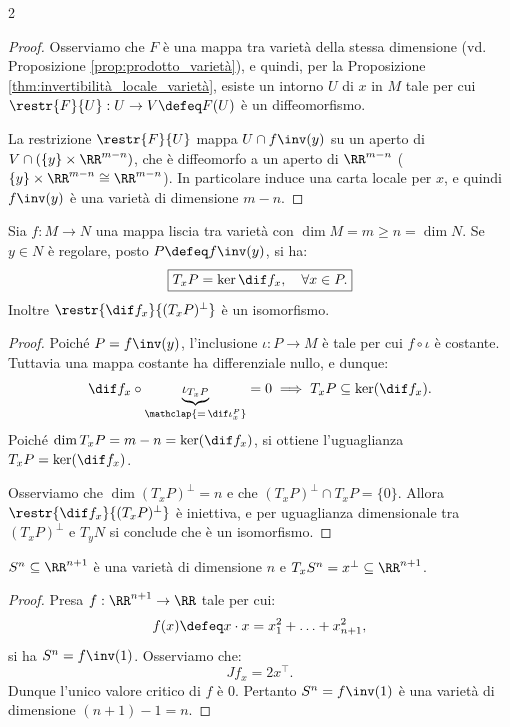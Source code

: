 \begin{multicols*}{2}
\begin{proof}
        Osserviamo che $F$ è una mappa tra varietà della stessa dimensione (vd. Proposizione
        \ref{prop:prodotto_varietà}), e quindi, per la Proposizione
        \ref{thm:invertibilità_locale_varietà}, esiste un intorno $U$ di $x$ in $M$ tale per cui
        $\restr{F}{U} : U \to V \defeq F(U)$ è un diffeomorfismo. \smallskip

        La restrizione $\restr{F}{U}$ mappa $U \cap f\inv(y)$ su un aperto di $V \cap (\{y\} \times \RR^{m-n})$,
        che è diffeomorfo a un aperto di $\RR^{m-n}$ ($\{y\} \times \RR^{m-n} \cong \RR^{m-n}$). In particolare
        induce una carta locale per $x$, e quindi $f\inv(y)$ è una varietà di dimensione $m-n$.
    \end{proof}

    \begin{proposition} \label{prop:tangente_valore_regolare}
        Sia $f : M \to N$ una mappa liscia tra varietà con $\dim M = m \geq n = \dim N$. Se
        $y \in N$ è regolare, posto $P \defeq f\inv(y)$, si ha:
        \[
            \boxed{T_x P = \ker \dif f_x, \quad \forall x \in P.}
        \]
        Inoltre $\restr{\dif f_x}{(T_x P)^\perp}$ è un isomorfismo.
    \end{proposition}

    \begin{proof}
        Poiché $P = f\inv(y)$, l'inclusione $\iota : P \to M$ è tale
        per cui $f \circ \iota$ è costante. Tuttavia una mappa costante
        ha differenziale nullo, e dunque:
        \[
            \dif f_x \circ \underbrace{\iota_{T_x P}}_{\mathclap{= \, \dif \iota^P_x}} = 0 \implies T_x P \subseteq \ker(\dif f_x).
        \]
        Poiché $\dim T_x P = m - n = \ker(\dif f_x)$, si ottiene
        l'uguaglianza $T_x P = \ker(\dif f_x)$. \smallskip

        Osserviamo che $\dim (T_x P)^\perp = n$ e che $(T_x P)^\perp \cap T_x P = \{0\}$.
        Allora $\restr{\dif f_x}{(T_x P)^\perp}$ è iniettiva, e per uguaglianza dimensionale
        tra $(T_x P)^\perp$ e $T_y N$ si conclude che è un isomorfismo.
    \end{proof}

    \begin{corollary} \label{cor:sn_è_varietà}
        $S^n \subseteq \RR^{n+1}$ è una varietà di dimensione $n$ e $T_x S^n = x^\perp \subseteq \RR^{n+1}$.
    \end{corollary}

    \begin{proof}
        Presa $f : \RR^{n+1} \to \RR$ tale per cui:
        \[
            f(x) \defeq x \cdot x = x_1^2 + \ldots + x_{n+1}^2,
        \]
        si ha $S^n = f\inv(1)$. Osserviamo che:
        \[
            Jf_x = 2x^\top.
        \]
        Dunque l'unico valore critico di $f$ è $0$. Pertanto
        $S^n = f\inv(1)$ è una varietà di dimensione $(n+1)-1 = n$. \smallskip


\end{proof}
\end{multicols*}

